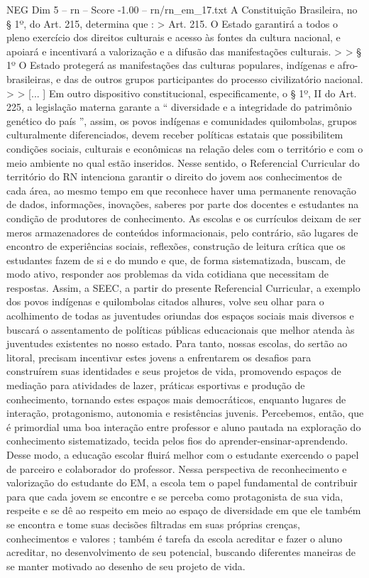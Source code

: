 \begin{textsample}{NEG Dim 5 – rn – Score -1.00 – rn/rn\_em\_17.txt}
A Constituição Brasileira, no § 1º, do Art. 215, determina que : > Art. 215.
O Estado garantirá a todos o pleno exercício dos direitos culturais e acesso às fontes da cultura nacional, e apoiará e incentivará a valorização e a difusão das manifestações culturais. > > § 1º O Estado protegerá as manifestações das culturas populares, indígenas e afro-brasileiras, e das de outros grupos participantes do processo civilizatório nacional. > > [... ] Em outro dispositivo constitucional, especificamente, o § 1º, II do Art. 225, a legislação materna garante a “ diversidade e a integridade do patrimônio genético do país ”, assim, os povos indígenas e comunidades quilombolas, grupos culturalmente diferenciados, devem receber políticas estatais que possibilitem condições sociais, culturais e econômicas na relação deles com o território e com o meio ambiente no qual estão inseridos.
Nesse sentido, o Referencial Curricular do território do RN intenciona garantir o direito do jovem aos conhecimentos de cada área, ao mesmo tempo em que reconhece haver uma permanente renovação de dados, informações, inovações, saberes por parte dos docentes e estudantes na condição de produtores de conhecimento.
As escolas e os currículos deixam de ser meros armazenadores de conteúdos informacionais, pelo contrário, são lugares de encontro de experiências sociais, reflexões, construção de leitura crítica que os estudantes fazem de si e do mundo e que, de forma sistematizada, buscam, de modo ativo, responder aos problemas da vida cotidiana que necessitam de respostas.
Assim, a SEEC, a partir do presente Referencial Curricular, a exemplo dos povos indígenas e quilombolas citados alhures, volve seu olhar para o acolhimento de todas as juventudes oriundas dos espaços sociais mais diversos e buscará o assentamento de políticas públicas educacionais que melhor atenda às juventudes existentes no nosso estado.
Para tanto, nossas escolas, do sertão ao litoral, precisam incentivar estes jovens a enfrentarem os desafios para construírem suas identidades e seus projetos de vida, promovendo espaços de mediação para atividades de lazer, práticas esportivas e produção de conhecimento, tornando estes espaços mais democráticos, enquanto lugares de interação, protagonismo, autonomia e resistências juvenis.
Percebemos, então, que é primordial uma boa interação entre professor e aluno pautada na exploração do conhecimento sistematizado, tecida pelos fios do aprender-ensinar-aprendendo.
Desse modo, a educação escolar fluirá melhor com o estudante exercendo o papel de parceiro e colaborador do professor.
Nessa perspectiva de reconhecimento e valorização do estudante do EM, a escola tem o papel fundamental de contribuir para que cada jovem se encontre e se perceba como protagonista de sua vida, respeite e se dê ao respeito em meio ao espaço de diversidade em que ele também se encontra e tome suas decisões filtradas em suas próprias crenças, conhecimentos e valores ; também é tarefa da escola acreditar e fazer o aluno acreditar, no desenvolvimento de seu potencial, buscando diferentes maneiras de se manter motivado ao desenho de seu projeto de vida.

\end{textsample}
